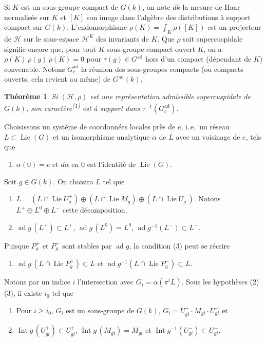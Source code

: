 \documentclass[10pt,a4paper]{amsart}
\theoremstyle{plain}
\newtheorem{theoreme}{Théorème}
\theoremstyle{remark}
\DeclareMathOperator{\Lie}{Lie}
\DeclareMathOperator{\Int}{Int}
\DeclareMathOperator{\ad}{ad}
\begin{document}
Si $K$ est un sous-groupe compact de $G(k)$, on note $dk$ la mesure de Haar normalisée
sur $K$ et $[K]$ son image dans l'algèbre des distributions à support compact sur $G(k)$.
L'endomorphisme $\rho(K) = \int_K \rho([K])$ est un projecteur de $\mathscr{H}$ sur le sous-espace
$\mathscr{H}^K$ des invariants de $K$. Que $\rho$ soit supercuspidale signifie encore que, pour
tout $K$ sous-groupe compact ouvert $K$, on a $\rho(K)\, \rho(g)\, \rho(K) = 0$ pour
$\tau(g) \in G^{\mathrm{ad}}$ hors d'un compact (dépendant de $K$) convenable. Notons
$G_c^{\mathrm{ad}}$ la réunion des sous-groupes compacts (ou compacts ouverts, cela revient au
même) de $G^{\mathrm{ad}}(k)$.

\begin{theoreme}
Si $(\mathscr{H}, \rho)$ est une représentation admissible supercuspidale de $G(k)$, son
caractère\textsuperscript{(1)} est à support dans $\tau^{-1}(G_c^{\mathrm{ad}})$.
\end{theoreme}

Choisissons un système de coordonnées locales près de $e$, i.\,e.\ un réseau
$L \subset \Lie(G)$ et un isomorphisme analytique $\alpha$ de $L$ avec un voisinage de $e$,
tels que
\begin{enumerate}
\item[(1)] $\alpha(0) = e$ et $d\alpha$ en $0$ est l'identité de $\Lie(G)$.
\end{enumerate}

Soit $g \in G(k)$. On choisira $L$ tel que
\begin{enumerate}
\item[(2)] $L = (L \cap \Lie U_g^+) \oplus (L \cap \Lie M_g) \oplus (L \cap \Lie U_g^-)$.
Notons $L^+ \oplus L^0 \oplus L^-$ cette décomposition.
\item[(3)] $\ad g\,(L^+) \subset L^+$, $\ad g\,(L^0) = L^0$, $\ad g^{-1}(L^-) \subset L^-$.
\end{enumerate}

Puisque $P_g^+$ et $P_g^-$ sont stables par $\ad g$, la condition (3) peut se récrire
\begin{enumerate}
\item[(3$'$)] $\ad g\,(L \cap \Lie P_g^+) \subset L$ et $\ad g^{-1}(L \cap \Lie P_g^-) \subset L$.
\end{enumerate}

Notons par un indice $i$ l'intersection avec $G_i = \alpha(\pi^i L)$. Sous les hypothèses (2) (3),
il existe $i_0$ tel que
\begin{enumerate}
\item[(4)] Pour $i \ge i_0$, $G_i$ est un sous-groupe de $G(k)$,
$G_i = U_{gi}^+ \cdot M_{gi} \cdot U_{gi}^-$ et
\item[(5)] $\Int g\,(U_{gi}^+) \subset U_{gi}^+$, $\Int g\,(M_{gi}) = M_{gi}$ et
$\Int g^{-1}(U_{gi}^-) \subset U_{gi}^-$.
\end{enumerate}
\end{document}
